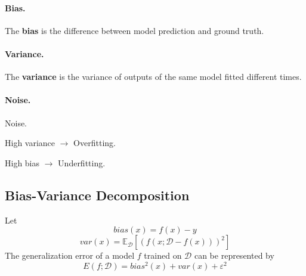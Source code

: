 \paragraph{Bias.} The \textbf{bias} is the difference between model prediction and ground truth.
\paragraph{Variance.} The \textbf{variance} is the variance of outputs of the same model fitted different times.
\paragraph{Noise.} Noise.

High variance $\to$ Overfitting.

High bias $\to$ Underfitting.

\subsection{Bias-Variance Decomposition}
Let
\[ bias(x) = f(x) - y \]
\[ var(x) = \mathbb{E}_{\mathcal{D}}[(f(x;\mathcal{D}-f(x)))^2] \]
The generalization error of a model $f$ trained on $\mathcal{D}$ can be represented by
\[ E(f;\mathcal{D}) = bias^2(x) + var(x) + \varepsilon^2 \]